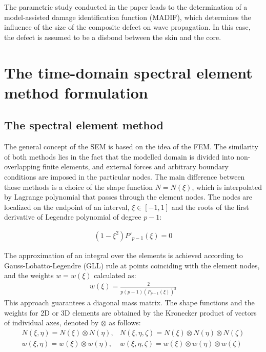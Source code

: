 \documentclass[materials,article,submit,moreauthors,pdftex]{Definitions/mdpi}
\begin{document}
The parametric study conducted in the paper leads to the determination of a model-assisted damage identification function (MADIF), which determines the influence of the size of the composite defect on wave propagation.
In this case, the defect is assumed to be a disbond between the skin and the core.

\section{The time-domain spectral element method formulation}
\label{sec:time_SEM}
\subsection{The spectral element method}
\label{sec:sem}
The general concept of the SEM is based on the idea of the FEM.
The similarity of both methods lies in the fact that the modelled domain is divided into non-overlapping finite elements, and external forces and arbitrary boundary conditions are imposed in the particular nodes.
The main difference between those methods is a choice of the shape function \( N=N(\xi )\), which is interpolated by Lagrange polynomial that passes through the element nodes. The nodes are localized on the endpoint of an interval, \(\xi\in[-1,1]\) and the roots of the first derivative of Legendre polynomial of degree \(p-1\):

\begin{eqnarray}
(1-\xi^2)P'_{p-1}(\xi)=0
\label{eq:nodes}
\end{eqnarray}

The approximation of an integral over the elements is achieved according to Gauss-Lobatto-Legendre (GLL) rule at points coinciding with the element nodes, 
and the weights \(w=w(\xi)\) calculated as:
\begin{eqnarray}
{w(\xi)} = \frac{2}{p(p-1)(P_{p-1}(\xi))^2}
\label{eq:weights}
\end{eqnarray}
This approach guarantees a diagonal mass matrix.
The shape functions and the weights for 2D or 3D elements are obtained by the Kronecker product of vectors of individual axes, denoted by \(\otimes\) as follows:
\begin{eqnarray}
N(\xi,\eta) = N(\xi)\otimes N(\eta), & N(\xi,\eta,\zeta) = N(\xi)\otimes N(\eta)\otimes N(\zeta) \nonumber\\
w(\xi,\eta) = w(\xi)\otimes w(\eta), & w(\xi,\eta,\zeta) = w(\xi)\otimes w(\eta)\otimes w(\zeta) 
\label{eq:3Dshape_weights}
\end{eqnarray}
\end{document}
